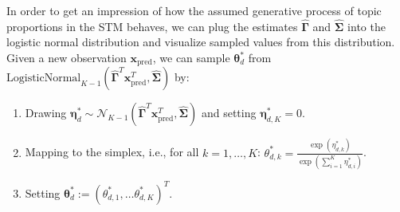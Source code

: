 In order to get an impression of how the assumed generative process of topic proportions in the STM behaves, we can plug the estimates $\hat{\boldsymbol{\Gamma}}$ and $\hat{\boldsymbol{\Sigma}}$ into the logistic normal distribution and visualize sampled values from this distribution. Given a new observation $\boldsymbol{x}_{\text{pred}}$, we can sample $\boldsymbol{\theta}_d^*$ from $\text{LogisticNormal}_{K-1}(\hat{\boldsymbol{\Gamma}}^T\boldsymbol{x}_{\text{pred}}^T, \hat{\boldsymbol{\Sigma}})$ by:

\begin{enumerate}
\item Drawing $\boldsymbol{\eta}_d^* \sim \mathcal{N}_{K-1}(\hat{\boldsymbol{\Gamma}}^T\boldsymbol{x}_{\text{pred}}^T, \hat{\boldsymbol{\Sigma}})$ and setting $\boldsymbol{\eta}^*_{d,K} = 0$.
\item Mapping to the simplex, i.e., for all $k = 1,\dots,K$: $\theta_{d,k}^* = \frac{\exp(\eta^*_{d,k})}{\exp(\sum_{i=1}^{K} \eta^*_{d,i})}$.
\item Setting $\boldsymbol{\theta}_d^* := (\theta_{d,1}^*, \dots \theta_{d,K}^*)^T$.
\end{enumerate}

